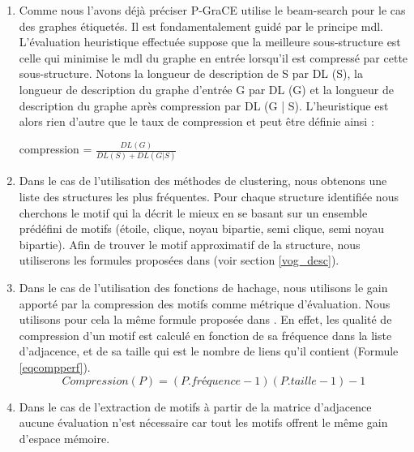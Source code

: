 \documentclass[a4paper,oneside,12pt]{report}
\theoremstyle{definition}
\begin{document}
		 \begin{enumerate}
		 \item Comme nous l'avons déjà préciser P-GraCE utilise le beam-search pour le cas des graphes  étiquetés. Il est fondamentalement guidé par le principe \gls{mdl}. L'évaluation heuristique effectuée suppose que la meilleure sous-structure est celle qui minimise le \gls{mdl} du graphe en entrée lorsqu'il est compressé par cette sous-structure. Notons la longueur de description de S par DL (S), la longueur de description du graphe d'entrée G  par DL (G) et la longueur de description du graphe après compression par DL (G | S). L'heuristique est alors rien d'autre que le taux de compression et peut être définie ainsi :
		 
		\begin{center}
		compression = $\frac{DL(G)}{DL(S)+DL(G|S)} $
		\end{center}
		
		\item  Dans le cas de l'utilisation des méthodes de clustering, nous obtenons une liste des structures les plus fréquentes. Pour chaque structure identifiée nous cherchons le motif qui la décrit le mieux en se basant sur un ensemble prédéfini de motifs (étoile, clique, noyau bipartie, semi clique, semi noyau bipartie). Afin de trouver le motif approximatif de la structure, nous utiliserons les formules proposées dans \citep{koutra2015summarizing} (voir section \ref{vog_desc}).
		
		\item Dans le cas de l'utilisation des fonctions de hachage, nous utilisons le gain apporté par la compression des motifs comme métrique d'évaluation. Nous utilisons pour cela la même formule proposée dans \citep{buehrer2008scalable}. En effet, les qualité de compression d'un motif est calculé en fonction de sa fréquence dans la liste d'adjacence, et de sa taille qui est le nombre de liens qu'il contient (Formule \ref{eqcompperf}).
				\begin{equation}
				Compression(P)=(P.fréquence-1)(P.taille-1)-1
				\label{eqcompperf}
				\end{equation}
				
		\item Dans le cas de l'extraction de motifs à partir de la matrice d'adjacence aucune évaluation n'est nécessaire car tout les motifs offrent le même gain d'espace mémoire.
		 
		
		 \end{enumerate}
		 
\end{document}
